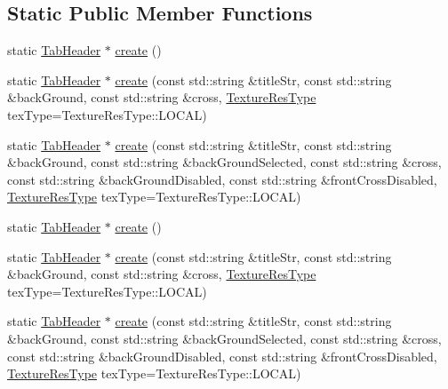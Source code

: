 \subsection*{Static Public Member Functions}
\begin{DoxyCompactItemize}
\item 
static \hyperlink{classui_1_1TabHeader}{Tab\+Header} $\ast$ \hyperlink{classui_1_1TabHeader_ac39888c340b96ebdf6f488840024fd27}{create} ()
\item 
static \hyperlink{classui_1_1TabHeader}{Tab\+Header} $\ast$ \hyperlink{classui_1_1TabHeader_ae3cbde1e566ae0f49cba73b2b5e891f4}{create} (const std\+::string \&title\+Str, const std\+::string \&back\+Ground, const std\+::string \&cross, \hyperlink{classui_1_1Widget_a040a65ec5ad3b11119b7e16b98bd9af0}{Texture\+Res\+Type} tex\+Type=Texture\+Res\+Type\+::\+L\+O\+C\+AL)
\item 
static \hyperlink{classui_1_1TabHeader}{Tab\+Header} $\ast$ \hyperlink{classui_1_1TabHeader_a239a67348a7378e165f8b46cfb5aefc7}{create} (const std\+::string \&title\+Str, const std\+::string \&back\+Ground, const std\+::string \&back\+Ground\+Selected, const std\+::string \&cross, const std\+::string \&back\+Ground\+Disabled, const std\+::string \&front\+Cross\+Disabled, \hyperlink{classui_1_1Widget_a040a65ec5ad3b11119b7e16b98bd9af0}{Texture\+Res\+Type} tex\+Type=Texture\+Res\+Type\+::\+L\+O\+C\+AL)
\item 
static \hyperlink{classui_1_1TabHeader}{Tab\+Header} $\ast$ \hyperlink{classui_1_1TabHeader_a91cf55f5d3dffe5693735f8741d15723}{create} ()
\item 
static \hyperlink{classui_1_1TabHeader}{Tab\+Header} $\ast$ \hyperlink{classui_1_1TabHeader_aac018851ef6f287158beea93d3fbca76}{create} (const std\+::string \&title\+Str, const std\+::string \&back\+Ground, const std\+::string \&cross, \hyperlink{classui_1_1Widget_a040a65ec5ad3b11119b7e16b98bd9af0}{Texture\+Res\+Type} tex\+Type=Texture\+Res\+Type\+::\+L\+O\+C\+AL)
\item 
static \hyperlink{classui_1_1TabHeader}{Tab\+Header} $\ast$ \hyperlink{classui_1_1TabHeader_a65d0cf38ece86dc07b1f9d482c9a0cd5}{create} (const std\+::string \&title\+Str, const std\+::string \&back\+Ground, const std\+::string \&back\+Ground\+Selected, const std\+::string \&cross, const std\+::string \&back\+Ground\+Disabled, const std\+::string \&front\+Cross\+Disabled, \hyperlink{classui_1_1Widget_a040a65ec5ad3b11119b7e16b98bd9af0}{Texture\+Res\+Type} tex\+Type=Texture\+Res\+Type\+::\+L\+O\+C\+AL)
\end{DoxyCompactItemize}
